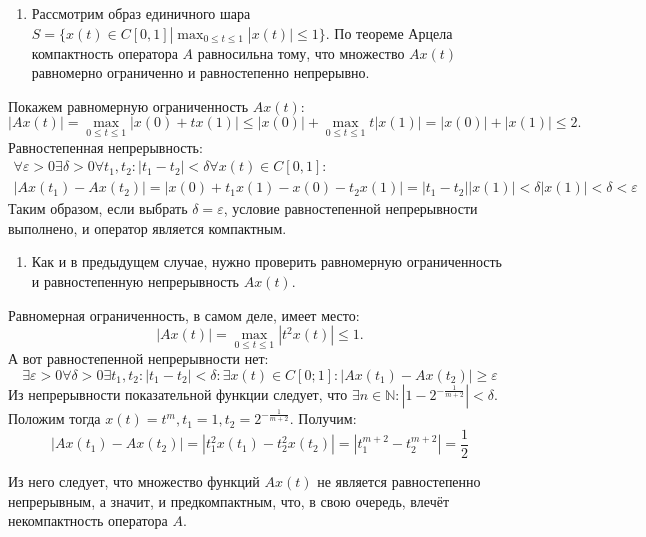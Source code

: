 \documentclass[11pt]{article}
\newcounter{th}\setcounter{th}{0}
\begin{document}
\begin{enumerate}
\item Рассмотрим образ единичного шара \(S = \{x(t) \in C[0, 1] | \max_{0 \leq t \leq 1}|x(t)| \leq 1\}\). По теореме Арцела компактность оператора \(A\) равносильна тому, что множество \(Ax(t)\) равномерно ограниченно и равностепенно непрерывно.
\end{enumerate}

Покажем равномерную ограниченность \(Ax(t)\):
\begin{equation*}
|Ax(t)| = \max_{0 \leq t \leq 1}|x(0) + tx(1)| \leq |x(0)| + \max_{0 \leq t \leq 1}t|x(1)| = |x(0)| + |x(1)| \leq 2.
\end{equation*}
Равностепенная непрерывность:
\begin{multline*}
\forall \varepsilon > 0 \exists \delta > 0 \forall t_1, t_2: |t_1 - t_2| < \delta \forall x(t) \in C[0, 1]: \\
|Ax(t_1) - Ax(t_2)| = |x(0) + t_1x(1) - x(0) - t_2x(1)| = |t_1 - t_2||x(1)| < \delta|x(1)| < \delta < \varepsilon
\end{multline*}
Таким образом, если выбрать $\delta = \varepsilon$, условие равностепенной непрерывности выполнено, и оператор является компактным.
\begin{enumerate}
\item Как и в предыдущем случае, нужно проверить равномерную ограниченность и равностепенную непрерывность \(Ax(t)\).
\end{enumerate}

Равномерная ограниченность, в самом деле, имеет место:
\begin{equation*}
|Ax(t)| = \max_{0 \leq t \leq 1}|t^2x(t)| \leq 1.
\end{equation*}
А вот равностепенной непрерывности нет:
\begin{equation*}
\exists \varepsilon > 0 \forall \delta > 0 \exists t_1, t_2: |t_1 - t_2| < \delta: \exists x(t) \in C[0; 1]: |Ax(t_1) - Ax(t_2)| \geq \varepsilon
\end{equation*}
Из непрерывности показательной функции следует, что $\exists n \in \mathbb{N}: |1 - 2^{-\frac1{m + 2}}| < \delta$. Положим тогда $x(t) = t^m, t_1 = 1, t_2 = 2^{-\frac1{m + 2}}$. Получим:
\begin{equation*}
|Ax(t_1) - Ax(t_2)| = |t_1^2x(t_1) - t_2^2x(t_2)| = |t_1^{m + 2} - t_2^{m + 2}| = \frac12
\end{equation*}

Из него следует, что множество функций $Ax(t)$ не является равностепенно непрерывным, а значит, и предкомпактным, что, в свою очередь, влечёт некомпактность оператора $A$.
\end{document}
